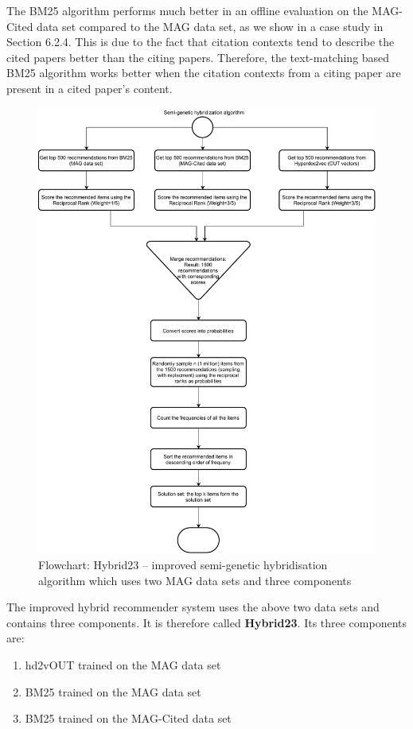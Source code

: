 The BM25 algorithm performs much better in an offline evaluation on the MAG-Cited data set compared to the MAG data set, as we show in a case study in Section 6.2.4. This is due to the fact that citation contexts tend to describe the cited papers better than the citing papers. Therefore, the text-matching based BM25 algorithm works better when the citation contexts from a citing paper are present in a cited paper's content. 
\begin{figure}
 \includegraphics[keepaspectratio, width=14cm]{figures/Approach/hybridv2flowchart.pdf}
  \caption{Flowchart: Hybrid23 -- improved semi-genetic hybridisation algorithm which uses two MAG data sets and three components}
  \label{fig:hybridv2flowchart}
\end{figure}
The improved hybrid recommender system uses the above two data sets and contains three components. It is therefore called \textbf{Hybrid23}. Its three components are:
\begin{enumerate}
    \item hd2vOUT trained on the MAG data set
    \item BM25 trained on the MAG data set
    \item BM25 trained on the MAG-Cited data set
\end{enumerate}
